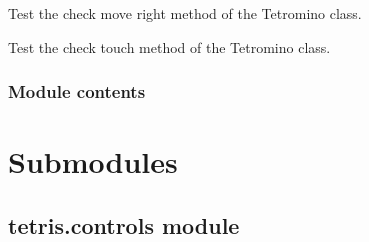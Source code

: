 \documentclass[letterpaper,10pt,english]{sphinxmanual}
\begin{document}
\begin{fulllineitems}
\begin{fulllineitems}
\end{fulllineitems}


\begin{fulllineitems}
\label{\detokenize{tetris.tests.test_tetrominos:tetris.tests.test_tetrominos.TestTetromino.test_check_move_right}}
\pysigstartsignatures
{}
\pysigstopsignatures
\sphinxAtStartPar
Test the check move right method of the Tetromino class.

\end{fulllineitems}


\begin{fulllineitems}
\label{\detokenize{tetris.tests.test_tetrominos:tetris.tests.test_tetrominos.TestTetromino.test_check_touch}}
\pysigstartsignatures
{}
\pysigstopsignatures
\sphinxAtStartPar
Test the check touch method of the Tetromino class.

\end{fulllineitems}


\end{fulllineitems}



\subsubsection{Module contents}
\label{\detokenize{tetris.tests:module-tetris.tests}}\label{\detokenize{tetris.tests:module-contents}}

\section{Submodules}
\label{\detokenize{tetris:submodules}}
\sphinxstepscope


\subsection{tetris.controls module}
\label{\detokenize{tetris.controls:module-tetris.controls}}\label{\detokenize{tetris.controls:tetris-controls-module}}\label{\detokenize{tetris.controls::doc}}
\end{document}
